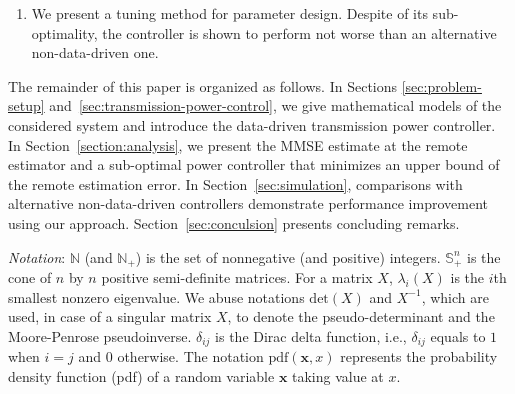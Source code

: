 \documentclass[twocolumn]{autart}    \usepackage{cite}
\begin{document}
{\begin{enumerate}
\item {We present a tuning method for parameter design.
Despite of its sub-optimality, the controller is shown to perform
{not worse} than an
alternative non-data-driven one.}
\vspace{-3mm}
\end{enumerate}
The remainder of this paper is organized
as follows. In
Sections \ref{sec:problem-setup} and~\ref{sec:transmission-power-control}, we give mathematical
models of the considered system and introduce the data-driven transmission power controller. In Section~\ref{section:analysis}, we
present the MMSE estimate at the remote estimator and
{a sub-optimal power controller that minimizes an upper bound of the remote
estimation error}. In Section~\ref{sec:simulation}, comparisons with
alternative non-data-driven controllers demonstrate performance
improvement using our approach. Section~\ref{sec:conculsion} presents concluding remarks.

\textit{Notation}: $\mathbb{N}$ (and $\mathbb{N}_+$) is the set of nonnegative
(and positive) integers. $\mathbb{S}_{+}^{n}$
is the cone of $n$ by $n$ positive semi-definite
matrices. For a matrix $X$, $\lambda_i(X)$ is the $i$th
smallest nonzero eigenvalue. We abuse
notations $\mathrm{det}(X)$ and $X^{-1}$, which are used, in case of a singular matrix $X$, to denote the pseudo-determinant and
the Moore-Penrose pseudoinverse.
$\delta_{ij}$ is the Dirac delta function, i.e., $\delta_{ij}$ equals to $1$ when $i=j$ and $0$ otherwise. The notation $\mathrm{pdf}(\mathbf{x},x)$
represents the probability density function (pdf) of a random variable $\mathbf{x}$ taking value at $x$.

}
\end{document}
